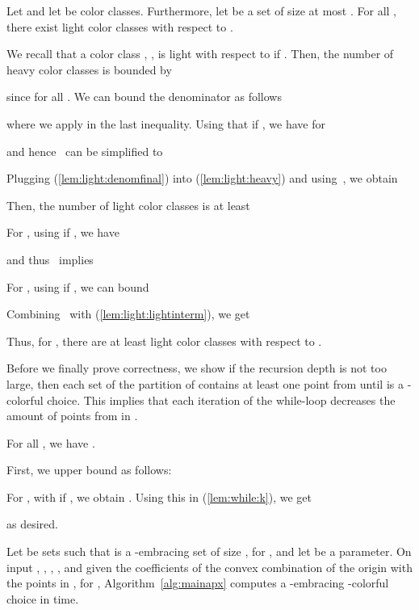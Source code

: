 \begin{lemma}\label{lem:light}
  Let  and let  be 
   color classes.
  Furthermore, let  be a set 
  of size at most . For all , 
  there exist  light color classes with respect to .
\end{lemma}
\begin{prf}
We recall that a color class , , is light with 
respect to  if . Then, the 
number of heavy color classes  is bounded by

since  for all . We can bound the denominator 
as follows

where we apply  in 
the last
inequality.  Using that  if 
, we have for 

and hence~ can be simplified to

Plugging (\ref{lem:light:denomfinal}) into (\ref{lem:light:heavy}) and
using~,
we obtain

Then, the number  of light color classes is at least

For , using
 if , we have

and thus~ implies

For , using
 if , we can bound

Combining~ with (\ref{lem:light:lightinterm}), we get

Thus, for , there are at least  light color classes with respect to .
\end{prf}

Before we finally prove correctness, we show if the recursion depth 
 is not too large, then each set of the partition of  contains 
at least one point from  until  is a -colorful choice. 
This implies that each iteration of
the while-loop decreases the amount of points from  in .

\begin{lemma}\label{lem:while}
  For all , we have 
  .
\end{lemma}
\begin{prf}
  First, we upper bound  as follows:

For , 
with  if 
,
we obtain . 
Using this in (\ref{lem:while:k}), we get

as desired.
\end{prf}

\begin{theorem}
\label{thm:bapx}
  Let  be
   sets such that  is a -embracing set
  of size , for , and let  be a
  parameter. On input , , , , and given the
  coefficients of the convex combination of the origin with the points 
  in , for ,
  Algorithm~\ref{alg:mainapx} computes a -embracing 
  -colorful
  choice in  time.
\end{theorem}

